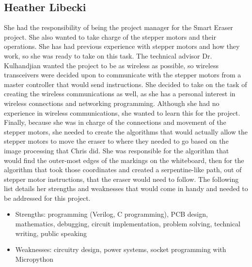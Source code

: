 \subsection{Heather Libecki}
She had the responsibility of being the project manager for the Smart Eraser project. She also wanted to take charge of the stepper motors and their operations. She has had previous experience with stepper motors and how they work, so she was ready to take on this task. The technical advisor Dr. Kulhandjian wanted the project to be as wireless as possible, so wireless transceivers were decided upon to communicate with the stepper motors from a master controller that would send instructions. She decided to take on the task of creating the wireless communications as well, as she has a personal interest in wireless connections and networking programming. Although she had no experience in wireless communications, she wanted to learn this for the project. Finally, because she was in charge of the connections and movement of the stepper motors, she needed to create the algorithms that would actually allow the stepper motors to move the eraser to where they needed to go based on the image processing that Chris did. She was responsible for the algorithm that would find the outer-most edges of the markings on the whiteboard, then for the algorithm that took those coordinates and created a serpentine-like path, out of stepper motor instructions, that the eraser would need to follow. The following list details her strengths and weaknesses that would come in handy and needed to be addressed for this project.
\begin{itemize}
	\item Strengths: programming (Verilog, C programming), PCB design, mathematics, debugging, circuit implementation, problem solving, technical writing, public speaking
	\item Weaknesses: circuitry design, power systems, socket programming with Micropython 
\end{itemize} 
